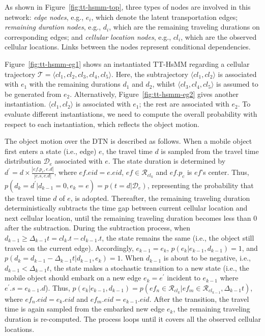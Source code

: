 \documentclass{vldb}
\begin{document}
	As shown in Figure~\ref{fig:tt-hsmm-top}, three types of nodes are involved in this network:
	{\it edge nodes}, e.g., $e_i$, which denote the latent transportation edges; {\it remaining duration nodes}, e.g., $d_i$, which are the remaining traveling durations on corresponding edges; and {\it cellular location nodes}, e.g., $cl_i$, which are the observed cellular locations.
	Links between the nodes represent conditional dependencies.
	
	Figure~\ref{fig:tt-hsmm-eg1} shows an instantiated TT-HsMM regarding a cellular trajectory $\mathcal{T}=\langle cl_1, cl_2, cl_3, cl_4, cl_5\rangle$.
	Here, the subtrajectory $\langle cl_1, cl_2 \rangle$ is associated with $e_1$ with the remaining durations $d_1$ and $d_2$, whilst $\langle cl_3, cl_4, cl_5 \rangle$ is assumed to be generated from $e_2$.
	Alternatively, Figure~\ref{fig:tt-hsmm-eg2} gives another instantiation. $\langle cl_1, cl_2\rangle$ is associated with $e_1$; the rest are associated with $e_2$.
	To evaluate different instantiations, we need to compute the overall probability with respect to each instantiation, which reflects the object motion.
	
	
	The object motion over the DTN is described as follows. When a mobile object first enters a state (i.e., edge) $e$, the travel time $d$ is sampled from the travel time distribution $\mathcal{D}_e$ associated with $e$. 
	The state duration is determined by $d^\prime=d\times \frac{|ef.p_c,e.d|}{|e.s,e.d|}$, where $ef.eid=e.eid$, $ef\in\mathcal{R}_{cl_k}$ and $ef.p_c$ is $ef$'s center.
	Thus, $p(d_k=d^\prime|d_{k-1}=0,e_k=e)=p(t=d|\mathcal{D}_e)$, representing the probability that the travel time $d$ of $e$, is adopted.
	Thereafter, the remaining traveling duration deterministically subtracts the time gap between current cellular location and next cellular location, until the remaining traveling duration becomes less than $0$ after the subtraction. 
	During the subtraction process, when $d_{k-1}\geq \Delta_{k-1} t=cl_{k}.t-cl_{k-1}.t$, the state remains the same (i.e., the object still travels on the current edge).
	Accordingly, $e_{k-1}=e_k$, $p(e_k|e_{k-1},d_{k-1})=1$, and $p(d_k=d_{k-1}-\Delta_{k-1}t|d_{k-1},e_k)=1$.
	When $d_{k-1}$ is about to be negative, i.e., $d_{k-1}< \Delta_{k-1}t$, the state makes a stochastic transition to a new state (i.e., the mobile object should embark on a new edge $e_k=e^\prime$ incident to $e_{k-1}$ where $e^\prime.s=e_{k-1}.d$). 
	Thus, $p(e_k|e_{k-1},d_{k-1})= p(ef_n\in \mathcal{R}_{cl_k}|ef_m\in \mathcal{R}_{cl_{k-1}},\Delta_{k-1} t)$, where $ef_n.eid=e_k.eid$ and $ef_m.eid=e_{k-1}.eid$.
	After the transition, the travel time is again sampled from the embarked new edge $e_k$, the remaining traveling duration is re-computed. The process loops until it covers all the observed cellular locations.
	
\end{document}
